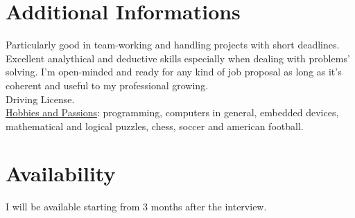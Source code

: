 \documentclass[margin]{res}
\begin{document}
\begin{resume}
\section{Additional Informations}
Particularly good in team-working and handling projects with short deadlines. Excellent
analythical and deductive skills especially when dealing with problems' solving. I'm open-minded
and ready for any kind of job proposal as long as it's coherent and useful to my professional growing. \\
Driving License. \\
\underline{Hobbies and Passions}: programming, computers in general, embedded devices, mathematical and
logical puzzles, chess, soccer and american football.

\section{Availability}
I will be available starting from 3 months after the interview.

\end{resume} 
\end{document}
